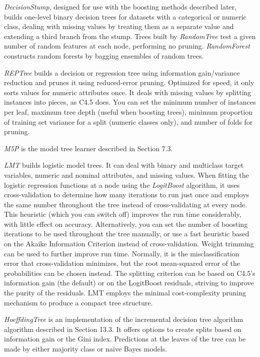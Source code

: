 \textit{DecisionStump}, designed for use with the boosting methods
described later, builds one-level binary decision trees for datasets
with a categorical or numeric class, dealing with missing values by
treating them as a separate value and extending a third branch from
the stump. Trees built by \textit{RandomTree} test a given number of
random features at each node, performing no
pruning. \textit{RandomForest} constructs random forests by bagging
ensembles of random trees.

\textit{REPTree} builds a decision or regression tree using
information gain/variance reduction and prunes it using reduced-error
pruning. Optimized for speed, it only sorts values for numeric
attributes once. It deals with missing values
by splitting instances into pieces, as C4.5 does. You can set the
minimum number of instances per leaf, maximum tree depth (useful when
boosting trees), minimum proportion of training set variance for a
split (numeric classes only), and number of folds for pruning.

\textit{M5P} is the model tree learner described in Section 7.3. 

\textit{LMT} builds logistic model trees. It can deal with binary and
multiclass target variables, numeric and nominal attributes, and
missing values. When fitting the logistic regression functions at a
node using the \textit{LogitBoost} algorithm, it uses cross-validation
to determine how many iterations to run just once and employs the same
number throughout the tree instead of cross-validating at every
node. This heuristic (which you can switch off) improves the run time
considerably, with little effect on accuracy. Alternatively, you can
set the number of boosting iterations to be used throughout the tree
manually, or use a fast heuristic based on the Akaike Information
Criterion instead of cross-validation. Weight trimming can be used to
further improve run time. Normally, it is the misclassification error
that cross-validation minimizes, but the root mean-squared error of
the probabilities can be chosen instead. The splitting criterion can
be based on C4.5’s information gain (the default) or on the LogitBoost
residuals, striving to improve the purity of the residuals. LMT
employs the minimal cost-complexity pruning mechanism to produce a
compact tree structure.

\textit{HoeffdingTree} is an implementation of the incremental decision tree
algorithm algorithm described in Section 13.3. It offers options to
create splits based on information gain or the Gini index. Predictions
at the leaves of the tree can be made by either majority class or
naive Bayes models.


